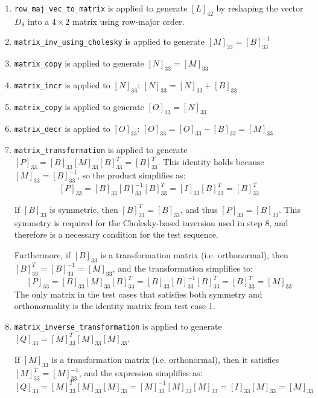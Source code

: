 \documentclass[11pt,fleqn]{report}
\begin{document}
\begin{enumerate}
        $[K]_{42}$ by reshaping the vector $D_8$ into a $4 \times 2$ matrix
        using column-major order.
    \item \texttt{row\_maj\_vec\_to\_matrix} is applied to generate
        $[L]_{42}$ by reshaping the vector $D_8$ into a $4 \times 2$ matrix
        using row-major order.
    \item \texttt{matrix\_inv\_using\_cholesky} is applied to generate
        $[M]_{33} = [B]_{33}^{-1}$
    \item \texttt{matrix\_copy} is applied to generate
        $[N]_{33} = [M]_{33}$
    \item \texttt{matrix\_incr} is applied to $[N]_{33}$:
        $[N]_{33} = [N]_{33} + [B]_{33}$
    \item \texttt{matrix\_copy} is applied to generate
        $[O]_{33} = [N]_{33}$
    \item \texttt{matrix\_decr} is applied to $[O]_{33}$:
        $[O]_{33} = [O]_{33} - [B]_{33} = [M]_{33}$
    \item \texttt{matrix\_transformation} is applied to generate
        $[P]_{33} = [B]_{33} [M]_{33} [B]_{33}^T = [B]_{33}^T$.
        This identity holds because $[M]_{33}=[B]^{-1}_{33}$, so the product
        simplifies as:
        \[
        [P]_{33} = [B]_{33}[B]^{-1}_{33}[B]^T_{33} = [I]_{33}[B]^T_{33} = [B]^T_{33}
        \]

        If $[B]_{33}$ is symmetric, then $[B]^T_{33} = [B]_{33}$, and thus $[P]_{33}=[B]_{33}$.
        This symmetry is required for the Cholesky-based inversion used in step 8, and therefore
        is a necessary condition for the test sequence.

        Furthermore, if $[B]_{33}$ is a transformation matrix (i.e. orthonormal), 
        then $[B]^T_{33} = [B]^{-1}_{33} = [M]_{33}$,
        and the transformation simplifies to:
        \[
        [P]_{33} = [B]_{33} [M]_{33} [B]^T_{33} = [B]_{33} [B]^{-1}_{33} [B]^T_{33} = [B]^T_{33} = [M]_{33}
        \]
        The only matrix in the test cases that satisfies both symmetry and orthonormality
        is the identity matrix from test case 1.

    \item \texttt{matrix\_inverse\_transformation} is applied to generate
        $[Q]_{33} = [M]^T_{33} [M]_{33} [M]_{33}$.

        If $[M]_{33}$ is a transformation matrix (i.e. orthonormal), then it satisfies
        $[M]^T_{33} = [M]^{-1}_{33}$, and the expression simplifies as:
        \[
        [Q]_{33} = [M]^T_{33} [M]_{33} [M]_{33} = [M]^{-1}_{33} [M]_{33} [M]_{33} = [I]_{33} [M]_{33} = [M]_{33}
        \]


\end{enumerate}
\end{document}
